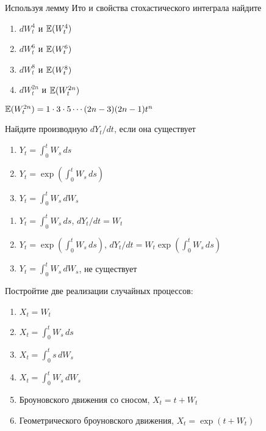 \begin{problem}
Используя лемму Ито и свойства стохастического интеграла найдите
\begin{enumerate}
\item $dW^4_t$ и $\mathbb{E}(W^4_t)$
\item $dW^6_t$ и $\mathbb{E}(W^6_t)$
\item $dW^8_t$ и $\mathbb{E}(W^8_t)$
\item $dW^{2n}_t$ и $\mathbb{E}(W^{2n}_t)$
\end{enumerate}

\begin{sol}
 $\mathbb{E}(W^{2n}_t)=1\cdot 3\cdot 5 \cdots (2n-3)(2n-1)t^n$
\end{sol}
\end{problem}

\begin{problem}
Найдите производную $dY_t/dt$, если она существует
\begin{enumerate}
\item $Y_t=\int_0^t W_s \, ds$
\item $Y_t=\exp (\int_0^t W_s \, ds)$
\item $Y_t=\int_0^t W_s \, dW_s$
\end{enumerate}


\begin{sol}
\begin{enumerate}
\item $Y_t=\int_0^t W_s \, ds$, $dY_t/dt=W_t$
\item $Y_t=\exp (\int_0^t W_s \, ds)$, $dY_t/dt=W_t\exp (\int_0^t W_s \, ds)$
\item $Y_t=\int_0^t W_s \, dW_s$, не существует
\end{enumerate}
\end{sol}
\end{problem}

\begin{problem}
Постройтие две реализации случайных процессов:
\begin{enumerate}
\item $X_t=W_t$
\item $X_t=\int_0^t W_s \, ds$
\item $X_t=\int_0^t s \, dW_s$
\item $X_t=\int_0^t W_s \, dW_s$
\item Броуновского движения со сносом, $X_t=t+W_t$
\item Геометрического броуновского движения, $X_t=\exp(t+W_t)$
\end{enumerate}


\begin{sol}
\end{sol}
\end{problem}

